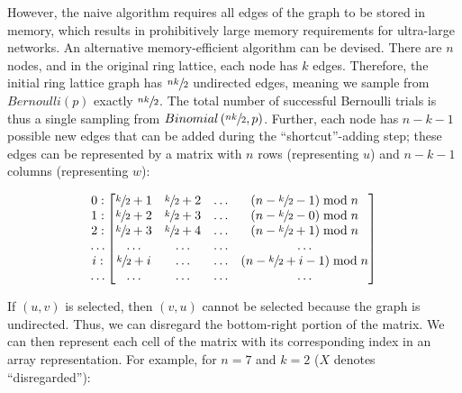 \documentclass[a4paper,num-refs,gigabyte]{oup-contemporary}
\begin{document}
However, the naive algorithm requires all edges of the graph to be stored in memory, which results in prohibitively large memory requirements for ultra-large networks. An alternative memory-efficient algorithm can be devised. There are $n$ nodes, and in the original ring lattice, each node has $k$ edges. Therefore, the initial ring lattice graph has $\sfrac{nk}{2}$ undirected edges, meaning we sample from $Bernoulli\left(p\right)$ exactly $\sfrac{nk}{2}$. The total number of successful Bernoulli trials is thus a single sampling from $Binomial\left(\sfrac{nk}{2},p\right)$. Further, each node has $n-k-1$ possible new edges that can be added during the ``shortcut''-adding step; these edges can be represented by a matrix with $n$ rows (representing $u$) and $n-k-1$ columns (representing $w$):

\begin{equation}
\begin{matrix}
0:\\
1:\\
2:\\
\ldots\\
i:\\
\ldots\\
\end{matrix}
\begin{bmatrix}
\sfrac{k}{2}+1 & \sfrac{k}{2}+2 & \ldots & \left(n-\sfrac{k}{2}-1\right)\bmod n\\
\sfrac{k}{2}+2 & \sfrac{k}{2}+3 & \ldots & \left(n-\sfrac{k}{2}-0\right)\bmod n\\
\sfrac{k}{2}+3 & \sfrac{k}{2}+4 & \ldots & \left(n-\sfrac{k}{2}+1\right)\bmod n\\
\ldots & \ldots & \ldots & \ldots\\
\sfrac{k}{2}+i & \ldots & \ldots & \left(n-\sfrac{k}{2}+i-1\right)\bmod n\\
\ldots & \ldots & \ldots & \ldots\\
\end{bmatrix}
\end{equation}

If $\left(u,v\right)$ is selected, then $\left(v,u\right)$ cannot be selected because the graph is undirected. Thus, we can disregard the bottom-right portion of the matrix. We can then represent each cell of the matrix with its corresponding index in an array representation. For example, for $n=7$ and $k=2$ ($X$ denotes ``disregarded''):
\end{document}
